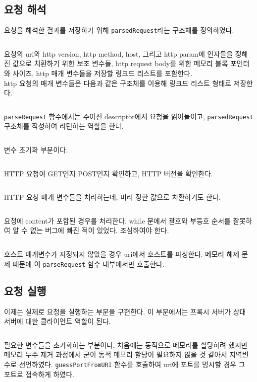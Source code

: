 \documentclass{report}
\begin{document}
\subsection{요청 해석}
요청을 해석한 결과를 저장하기 위해 \lstinline{parsedRequest}라는 구조체를 정의하였다.
\inputminted[firstline=25,lastline=37, linenos, breaklines]{C}{../submit/proxy.c}
요청의 uri와 http version, http method, host, 그리고 http param에 인자들을 정해진 값으로 치환하기 위한 보조 변수들, http request body를 위한 메모리 블록 포인터와 사이즈, http 매개 변수들을 저장할 링크드 리스트를 포함한다.
\\
http 요청의 매개 변수들은 다음과 같은 구조체를 이용해 링크드 리스트 형태로 저장한다.
\inputminted[firstline=19,lastline=23, linenos, breaklines]{C}{../submit/proxy.c}

\lstinline{parseRequest} 함수에서는 주어진 descriptor에서 요청을 읽어들이고, \lstinline{parsedRequest} 구조체를 작성하여 리턴하는 역할을 한다.

\inputminted[firstline=153,lastline=172, linenos, breaklines]{C}{../submit/proxy.c}
변수 초기화 부분이다.

\inputminted[firstline=174,lastline=196, linenos, breaklines]{C}{../submit/proxy.c}
HTTP 요청이 GET인지 POST인지 확인하고, HTTP 버전을 확인한다.
\inputminted[firstline=197,lastline=232, linenos, breaklines]{C}{../submit/proxy.c}
HTTP 요청 매개 변수들을 처리하는데, 미리 정한 값으로 치환하기도 한다.
\inputminted[firstline=233,lastline=250, linenos, breaklines]{C}{../submit/proxy.c}
요청에 content가 포함된 경우를 처리한다. while 문에서 괄호와 부등호 순서를 잘못하여 알 수 없는 버그에 빠진 적이 있었다. 조심하여야 한다.
\inputminted[firstline=251,lastline=255, linenos, breaklines]{C}{../submit/proxy.c}
호스트 매개변수가 지정되지 않았을 경우 uri에서 호스트를 파싱한다. 메모리 해제 문제 때문에 이 \lstinline{parseRequest} 함수 내부에서만 호출한다.
\subsection{요청 실행}
이제는 실제로 요청을 실행하는 부분을 구현한다. 이 부분에서는 프록시 서버가 상대 서버에 대한 클라이언트 역할이 된다.
\inputminted[firstline=267,lastline=279, linenos, breaklines]{C}{../submit/proxy.c}
필요한 변수들을 초기화하는 부분이다. 처음에는 동적으로 메모리를 할당하려 했지만 메모리 누수 제거 과정에서 굳이 동적 메모리 할당이 필요하지 않을 것 같아서 지역변수로 선언하였다. \lstinline{guessPortFromURI} 함수를 호출하여 uri에 포트를 명시할 경우 그 포트로 접속하게 하였다.
\end{document}
